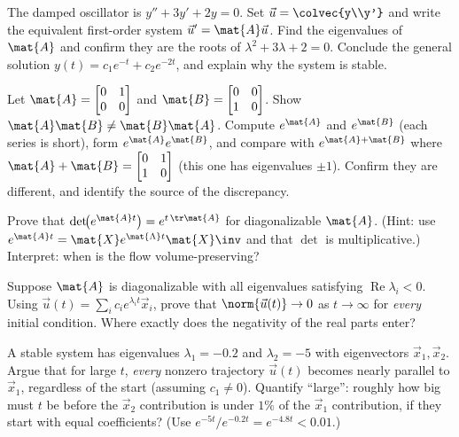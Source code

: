 \begin{exercise}
\label{ch25:ex-secondorder}
The damped oscillator is $y''+3y'+2y=0$. Set $\vec{u}=\colvec{y\\y'}$ and write
the equivalent first-order system $\vec{u}'=\mat{A}\vec{u}$. Find the eigenvalues
of $\mat{A}$ and confirm they are the roots of $\lambda^2+3\lambda+2=0$. Conclude
the general solution $y(t)=c_1 e^{-t}+c_2 e^{-2t}$, and explain why the system is
stable.
\end{exercise}

\begin{exercise}
\label{ch25:ex-commutator}
Let $\mat{A}=\begin{bmatrix}0&1\\0&0\end{bmatrix}$ and
$\mat{B}=\begin{bmatrix}0&0\\1&0\end{bmatrix}$. Show $\mat{A}\mat{B}\neq
\mat{B}\mat{A}$. Compute $e^{\mat{A}}$ and $e^{\mat{B}}$ (each series is short),
form $e^{\mat{A}}e^{\mat{B}}$, and compare with $e^{\mat{A}+\mat{B}}$ where
$\mat{A}+\mat{B}=\begin{bmatrix}0&1\\1&0\end{bmatrix}$ (this one has eigenvalues
$\pm1$). Confirm they are different, and identify the source of the discrepancy.
\end{exercise}

\begin{exercise}
\label{ch25:ex-trace}
Prove that $\det\!\bigl(e^{\mat{A}t}\bigr)=e^{t\,\tr\mat{A}}$ for diagonalizable
$\mat{A}$. (Hint: use $e^{\mat{A}t}=\mat{X}e^{\mat{\Lambda}t}\mat{X}\inv$ and that
$\det$ is multiplicative.) Interpret: when is the flow volume-preserving?
\end{exercise}

\begin{exercise}
\label{ch25:ex-stability}
Suppose $\mat{A}$ is diagonalizable with all eigenvalues satisfying
$\operatorname{Re}\lambda_i<0$. Using $\vec{u}(t)=\sum_i c_i e^{\lambda_i t}
\vec{x}_i$, prove that $\norm{\vec{u}(t)}\to0$ as $t\to\infty$ for \emph{every}
initial condition. Where exactly does the negativity of the real parts enter?
\end{exercise}

\begin{exercise}
\label{ch25:ex-slowmode}
A stable system has eigenvalues $\lambda_1=-0.2$ and $\lambda_2=-5$ with
eigenvectors $\vec{x}_1,\vec{x}_2$. Argue that for large $t$, \emph{every}
nonzero trajectory $\vec{u}(t)$ becomes nearly parallel to $\vec{x}_1$, regardless
of the start (assuming $c_1\neq0$). Quantify ``large'': roughly how big must $t$
be before the $\vec{x}_2$ contribution is under $1\%$ of the $\vec{x}_1$
contribution, if they start with equal coefficients? (Use $e^{-5t}/e^{-0.2t}=
e^{-4.8t}<0.01$.)
\end{exercise}
